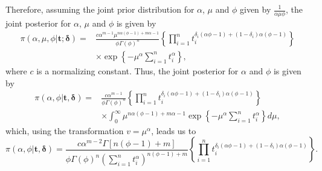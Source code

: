 \documentclass[12pt]{article} %
\newcommand{\bs}{\boldsymbol}
\theoremstyle{plain}%
\theoremstyle{definition}
\theoremstyle{remark}
\begin{document}
Therefore, assuming the joint prior distribution for $\alpha$, $\mu$ and $\phi$ given by $\frac{1}{\alpha\mu\phi}$, the joint posterior for $\alpha$, $\mu$ and $\phi$ is given by
\begin{align*}%
\pi(\alpha,\mu,\phi|\bs{t;\delta})
=&\frac{c\alpha^{m-1}\mu^{n\alpha(\phi-1)+m\alpha-1}}{\phi\Gamma(\phi)^n}\left\{\prod_{i=1}^n{t_i^{\delta_i(\alpha\phi-1)+(1-\delta_i)\alpha(\phi-1)}}\right\}\nonumber \\
&\times \exp\left\{-\mu^{\alpha}\sum_{i=1}^n t_i^{\alpha}\right\},
\end{align*} %
where $c$ is a normalizing constant. Thus, the joint posterior for $\alpha$ and $\phi$ is given by
\begin{align*}\pi(\alpha,\phi|\bs{t,\delta})
=&\frac{c\alpha^{m-1}}{\phi\Gamma(\phi)^n}\left\{\prod_{i=1}^n{t_i^{\delta_i(\alpha\phi-1)+(1-\delta_i)\alpha(\phi-1)}}\right\}\nonumber\\
&\times \int_{0}^\infty \mu^{n\alpha(\phi-1)+m\alpha-1} \exp\left\{-\mu^{\alpha}\sum_{i=1}^n t_i^{\alpha}\right\}d\mu,
\end{align*}
which, using the transformation $v=\mu^{\alpha}$, leads us to
\begin{equation*}%
\pi(\alpha,\phi|\bs{t,\delta})
=\frac{c\alpha^{m-2}\Gamma\left[n(\phi-1)+m\right]}{\phi\Gamma(\phi)^n(\sum_{i=1}^n t_i^\alpha)^{n(\phi-1)+m}} \left\{\prod_{i=1}^n{t_i^{\delta_i(\alpha\phi-1)+(1-\delta_i)\alpha(\phi-1)}}\right\}.
\end{equation*}
\end{document}
